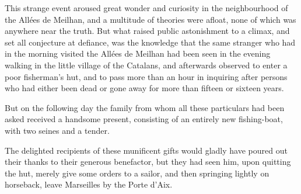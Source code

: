  This strange event aroused great wonder and curiosity in the neighbourhood of the Allées de Meilhan, and a multitude of theories were afloat, none of which was anywhere near the truth. But what raised public astonishment to a climax, and set all conjecture at defiance, was the knowledge that the same stranger who had in the morning visited the Allées de Meilhan had been seen in the evening walking in the little village of the Catalans, and afterwards observed to enter a poor fisherman's hut, and to pass more than an hour in inquiring after persons who had either been dead or gone away for more than fifteen or sixteen years. 

 But on the following day the family from whom all these particulars had been asked received a handsome present, consisting of an entirely new fishing-boat, with two seines and a tender. 

 The delighted recipients of these munificent gifts would gladly have poured out their thanks to their generous benefactor, but they had seen him, upon quitting the hut, merely give some orders to a sailor, and then springing lightly on horseback, leave Marseilles by the Porte d'Aix. 